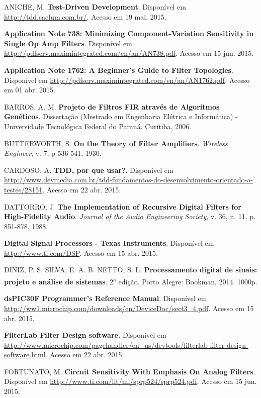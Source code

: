 \begin{thebibliography}{99}
 ANICHE, M. \textbf{Test-Driven Development}. Disponível em \url{http://tdd.caelum.com.br/}. Acesso em 19 mai. 2015.

 \textbf{Application Note 738: Minimizing Component-Variation Sensitivity in
Single Op Amp Filters}. Disponível em \url{http://pdfserv.maximintegrated.com/en/an/AN738.pdf}. Acesso em 15 jun. 2015.

 \textbf{Application Note 1762: A Beginner's Guide to Filter Topologies}. Disponível em \url{http://pdfserv.maximintegrated.com/en/an/AN1762.pdf}. Acesso em 01 abr. 2015.

 BARROS, A. M. \textbf{Projeto de Filtros FIR através de Algoritmos Genéticos}. Dissertação (Mestrado em Engenharia Elétrica e Informática) - Universidade Tecnológica Federal do Paraná. Curitiba, 2006. %

 BUTTERWORTH, S. \textbf{On the Theory of Filter Amplifiers}. \textit{Wireless Engineer}, v. 7, p 536-541, 1930. 

 CARDOSO, A. \textbf{TDD, por que usar?}. Disponível em \url{http://www.devmedia.com.br/tdd-fundamentos-do-desenvolvimento-orientado-a-testes/28151}. Acesso em 22 abr. 2015.

 DATTORRO, J. \textbf{The Implementation of Recursive Digital Filters for High-Fidelity Audio}. \textit{Journal of the Audio Engineering Society}, v. 36, n. 11, p. 851-878, 1988.

 \textbf{Digital Signal Processors - Texas Instruments}. Disponível em \url{http://www.ti.com/DSP}. Acesso em 15 abr. 2015.

 DINIZ, P. S. SILVA, E. A. B. NETTO, S. L. \textbf{Processamento digital de sinais: projeto e análise de sistemas}. 2\textsuperscript{a} edição. Porto Alegre: Bookman, 2014. 1000p.

 \textbf{dsPIC30F Programmer's Reference Manual}. Disponível em \url{http://ww1.microchip.com/downloads/en/DeviceDoc/sect3_4.pdf}. Acesso em 15 abr. 2015.

 \textbf{FilterLab Filter Design software.} Disponível em \url{http://www.microchip.com/pagehandler/en_us/devtools/filterlab-filter-design-software.html}. Acesso em 22 abr. 2015.

 FORTUNATO, M. \textbf{Circuit Sensitivity With Emphasis On Analog Filters}. Disponível em \url{http://www.ti.com/lit/ml/sprp524/sprp524.pdf}. Acesso em 15 jun. 2015.


\end{thebibliography}

